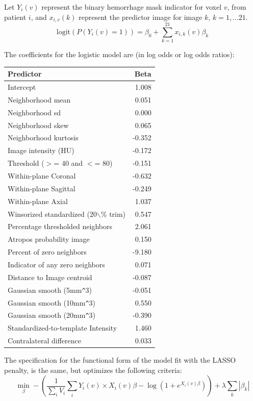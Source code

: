 Let $Y_{i}(v)$ represent the binary hemorrhage mask indicator for voxel $v$, from patient $i$, and $x_{i,v}(k)$ represent the predictor image for image $k$, $k = 1, \dots 21$.
$$
\text{logit}\left(P(Y_{i}(v) = 1)\right) = \beta_0 + \sum_{k = 1}^{21} x_{i, k}(v)\beta_{k}
$$

The coefficients for the logistic model are (in log odds or log odds ratios):

\begin{table}[ht]
\centering
\begin{tabular}{lr}
  \hline
Predictor & Beta \\ 
  \hline
Intercept & 1.008 \\ 
  Neighborhood mean & 0.051 \\ 
  Neighborhood sd & 0.000 \\ 
  Neighborhood skew & 0.065 \\ 
  Neighborhood kurtosis & -0.352 \\ 
  Image intensity (HU) & -0.172 \\ 
  Threshold ($>$= 40 and $<$= 80) & -0.151 \\ 
  Within-plane Coronal & -0.632 \\ 
  Within-plane Sagittal & -0.249 \\ 
  Within-plane Axial & 1.037 \\ 
  Winsorized standardized (20$\backslash$\% trim) & 0.547 \\ 
  Percentage thresholded neighbors & 2.061 \\ 
  Atropos probability image & 0.150 \\ 
  Percent of zero neighbors & -9.180 \\ 
  Indicator of any zero neighbors & 0.071 \\ 
  Distance to Image centroid & -0.087 \\ 
  Gaussian smooth (5mm\verb|^|3) & -0.051 \\ 
  Gaussian smooth (10mm\verb|^|3) & 0.550 \\ 
  Gaussian smooth (20mm\verb|^|3) & -0.390 \\ 
  Standardized-to-template Intensity & 1.460 \\ 
  Contralateral difference & 0.033 \\ 
   \hline
\end{tabular}
\end{table}


The specification for the functional form of the model fit with the LASSO penalty, is the same, but optimizes the following criteria:
$$
\min_{\beta} - \left( \frac{1}{\sum_{i}V_i} \sum_i Y_{i}(v) \times X_i(v)\beta - \log \left(1 + e^{X_i(v)\beta}\right) \right) +\lambda\sum_{k}\left|\beta_k\right|
$$





